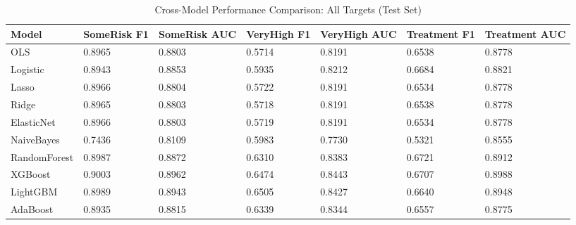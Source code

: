 \begin{table}
\caption{Cross-Model Performance Comparison: All Targets (Test Set)}
\label{tab:robustness_comparison}
\begin{tabular}{lllllll}
\toprule
Model & SomeRisk F1 & SomeRisk AUC & VeryHigh F1 & VeryHigh AUC & Treatment F1 & Treatment AUC \\
\midrule
OLS & 0.8965 & 0.8803 & 0.5714 & 0.8191 & 0.6538 & 0.8778 \\
Logistic & 0.8943 & 0.8853 & 0.5935 & 0.8212 & 0.6684 & 0.8821 \\
Lasso & 0.8966 & 0.8804 & 0.5722 & 0.8191 & 0.6534 & 0.8778 \\
Ridge & 0.8965 & 0.8803 & 0.5718 & 0.8191 & 0.6538 & 0.8778 \\
ElasticNet & 0.8966 & 0.8803 & 0.5719 & 0.8191 & 0.6534 & 0.8778 \\
NaiveBayes & 0.7436 & 0.8109 & 0.5983 & 0.7730 & 0.5321 & 0.8555 \\
RandomForest & 0.8987 & 0.8872 & 0.6310 & 0.8383 & 0.6721 & 0.8912 \\
XGBoost & 0.9003 & 0.8962 & 0.6474 & 0.8443 & 0.6707 & 0.8988 \\
LightGBM & 0.8989 & 0.8943 & 0.6505 & 0.8427 & 0.6640 & 0.8948 \\
AdaBoost & 0.8935 & 0.8815 & 0.6339 & 0.8344 & 0.6557 & 0.8775 \\
\bottomrule
\end{tabular}
\end{table}
